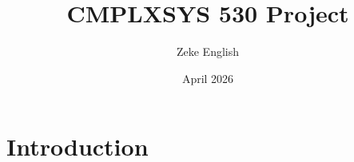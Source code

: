 \documentclass{article}
\title{CMPLXSYS 530 Project}
\author{Zeke English}
\date{April 2026}
\begin{document}
\maketitle

\section{Introduction}



\end{document}
